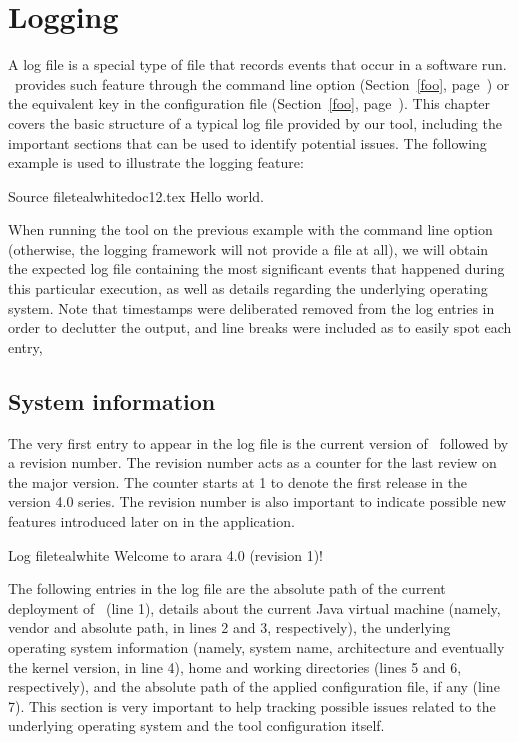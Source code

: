 \chapter{Logging}
\label{chap:logging}

A log file is a special type of file that records events that occur in a software run. \arara\ provides such feature through the  command line option (Section~\ref{foo}, page~\pageref{foo}) or the equivalent key in the configuration file (Section~\ref{foo}, page~\pageref{foo}). This chapter covers the basic structure of a typical log file provided by our tool, including the important sections that can be used to identify potential issues. The following example is used to illustrate the logging feature:

\begin{ncodebox}{Source file}{teal}{\icnote}{white}{doc12.tex}
Hello world.
\bye
\end{ncodebox}

When running the tool on the previous example with the  command line option (otherwise, the logging framework will not provide a file at all), we will obtain the expected  log file containing the most significant events that happened during this particular execution, as well as details regarding the underlying operating system. Note that timestamps were deliberated removed from the log entries in order to declutter the output, and line breaks were included as to easily spot each entry,

\section{System information}
\label{sec:systeminformation}

The very first entry to appear in the log file is the current version of \arara\ followed by a revision number. The revision number acts as a counter for the last review on the major version. The counter starts at 1 to denote the first release in the version 4.0 series. The revision number is also important to indicate possible new features introduced later on in the application.

\begin{codebox}{Log file}{teal}{\icnote}{white}
Welcome to arara 4.0 (revision 1)!
\end{codebox}

The following entries in the log file are the absolute path of the current deployment of \arara\ (line 1), details about the current Java virtual machine (namely, vendor and absolute path, in lines 2 and 3, respectively), the underlying operating system information (namely, system name, architecture and eventually the kernel version, in line 4), home and working directories (lines 5 and 6, respectively), and the absolute path of the applied configuration file, if any (line 7). This section is very important to help tracking possible issues related to the underlying operating system and the tool configuration itself.

